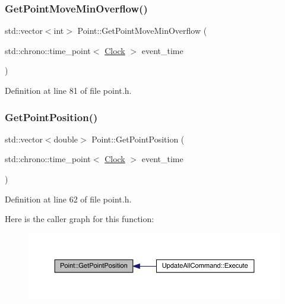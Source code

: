 \subsubsection{\texorpdfstring{Get\+Point\+Move\+Min\+Overflow()}{GetPointMoveMinOverflow()}}
{\footnotesize\ttfamily std\+::vector$<$int$>$ Point\+::\+Get\+Point\+Move\+Min\+Overflow (\begin{DoxyParamCaption}\item[{std\+::chrono\+::time\+\_\+point$<$ \mbox{\hyperlink{universe_8h_a0ef8d951d1ca5ab3cfaf7ab4c7a6fd80}{Clock}} $>$}]{event\+\_\+time }\end{DoxyParamCaption})\hspace{0.3cm}{\ttfamily [inline]}}



Definition at line 81 of file point.\+h.

\mbox{\label{class_point_a521d229550d7f38851f9ffb1933046a6}} 
\subsubsection{\texorpdfstring{Get\+Point\+Position()}{GetPointPosition()}}
{\footnotesize\ttfamily std\+::vector$<$double$>$ Point\+::\+Get\+Point\+Position (\begin{DoxyParamCaption}\item[{std\+::chrono\+::time\+\_\+point$<$ \mbox{\hyperlink{universe_8h_a0ef8d951d1ca5ab3cfaf7ab4c7a6fd80}{Clock}} $>$}]{event\+\_\+time }\end{DoxyParamCaption})\hspace{0.3cm}{\ttfamily [inline]}}



Definition at line 62 of file point.\+h.

Here is the caller graph for this function\+:\nopagebreak
\begin{figure}[H]
\begin{center}
\leavevmode
\includegraphics[width=350pt]{class_point_a521d229550d7f38851f9ffb1933046a6_icgraph}
\end{center}
\end{figure}
\mbox{\label{class_point_a98557a7ad341f981b13bb009994868f2}} 
